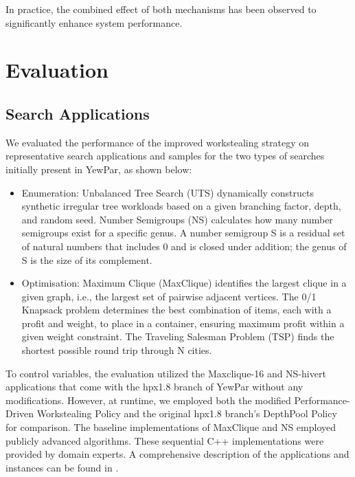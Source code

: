 \documentclass{mproj}
\begin{document}
In practice, the combined effect of both mechanisms has been observed to significantly enhance system performance.



\chapter{Evaluation}

\section{Search Applications}

We evaluated the performance of the improved workstealing strategy on representative search applications and samples for the two types of searches initially present in YewPar, as shown below:

\begin{itemize}
    \item Enumeration:
          Unbalanced Tree Search (UTS) dynamically constructs synthetic irregular tree workloads based on a given branching factor, depth, and random seed\cite{olivier2006uts}.
          Number Semigroups (NS) calculates how many number semigroups exist for a specific genus\cite{fromentin2016exploring}.
          A number semigroup S is a residual set of natural numbers that includes 0 and is closed under addition;
          the genus of S is the size of its complement.
    \item Optimisation:
          Maximum Clique (MaxClique) identifies the largest clique in a given graph, i.e., the largest set of pairwise adjacent vertices.
          The 0/1 Knapsack problem determines the best combination of items, each with a profit and weight, to place in a container,
          ensuring maximum profit within a given weight constraint.
          The Traveling Salesman Problem (TSP) finds the shortest possible round trip through N cities.
\end{itemize}

To control variables, the evaluation utilized the Maxclique-16 and NS-hivert applications that come with the hpx1.8 branch of YewPar without any modifications.
However, at runtime, we employed both the modified Performance-Driven Workstealing Policy and the original hpx1.8 branch's DepthPool Policy for comparison.
The baseline implementations of MaxClique\cite{mccreesh2013multithreading} and NS\cite{fromentin2016exploring} employed publicly advanced algorithms.
These sequential C++ implementations were provided by domain experts.
A comprehensive description of the applications and instances can be found in \cite{archibald2018}.
\end{document}
